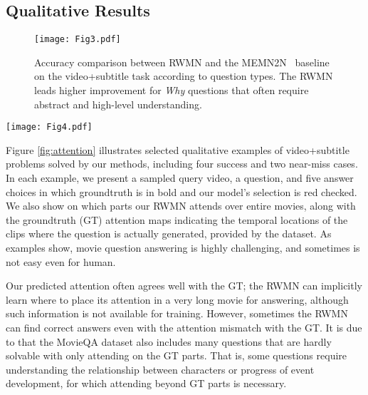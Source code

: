 \documentclass[10pt,twocolumn,letterpaper]{article}
\theoremstyle{nonumberplain}
\begin{document}
\subsection{Qualitative Results}
\label{sec:qual_results}


\begin{figure}[t!]
\centering
\texttt{[image: Fig3.pdf]}
\caption{Accuracy comparison between RWMN and the MEMN2N~\cite{tapaswi2016movieqa} baseline on the video+subtitle task according to question types. 
The RWMN leads higher improvement for \textit{Why} questions that often require abstract and high-level understanding.}
\label{fig:perf_qtype}
\end{figure}




\begin{figure*}[t!]
\centering
\texttt{[image: Fig4.pdf]}
\caption{Qualitative examples of MovieQA video+subtitle problems solved by our methods  (success cases in the top two rows, and failure cases in the last row). Bold sentences are groundtruth answers and red check symbols indicate our model's selection.
In each example, we also show on which parts our RWMN model attend over entire movie.
The attention by the RWMN often matches well with the groundtruth (GT) where the question is actually generated.}
\label{fig:attention}
\end{figure*}

Figure \ref{fig:attention} illustrates selected qualitative examples of video+subtitle problems solved by our methods, including four success and two near-miss cases. 
In each example, we present a sampled query video, a question, and five answer choices in which groundtruth is in bold and our model's selection is red checked.  
We also show on which parts our RWMN attends over entire movies, along with the groundtruth (GT) attention maps indicating the temporal locations of the clips where the question is actually generated, provided by the dataset. 
As examples show, movie question answering is highly challenging, and sometimes is not easy even for human. 

Our predicted attention often agrees well with the GT; the RWMN can implicitly learn where to place its attention in a very long movie for answering, although such information is not available for training. 
However, sometimes the RWMN can find correct answers even with the attention mismatch with the GT.
It is due to that  the MovieQA dataset also includes many questions that are hardly solvable with only attending on the GT parts.
That is, some questions require understanding the relationship between characters or progress of event development, for which attending beyond GT parts is necessary. 
\end{document}
